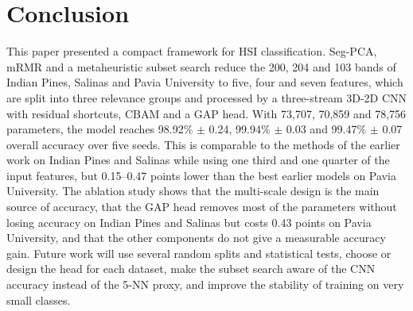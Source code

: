 \documentclass[conference]{IEEEtran}
\begin{document}
	\section{Conclusion} \label{conclusion}
	This paper presented a compact framework for HSI classification. Seg-PCA, mRMR and a metaheuristic subset search reduce the 200, 204 and 103 bands of Indian Pines, Salinas and Pavia University to five, four and seven features, which are split into three relevance groups and processed by a three-stream 3D-2D CNN with residual shortcuts, CBAM and a GAP head. With 73,707, 70,859 and 78,756 parameters, the model reaches 98.92\% $\pm$ 0.24, 99.94\% $\pm$ 0.03 and 99.47\% $\pm$ 0.07 overall accuracy over five seeds. This is comparable to the methods of the earlier work\cite{ahmed2024} on Indian Pines and Salinas while using one third and one quarter of the input features, but 0.15--0.47 points lower than the best earlier models on Pavia University. The ablation study shows that the multi-scale design is the main source of accuracy, that the GAP head removes most of the parameters without losing accuracy on Indian Pines and Salinas but costs 0.43 points on Pavia University, and that the other components do not give a measurable accuracy gain. Future work will use several random splits and statistical tests, choose or design the head for each dataset, make the subset search aware of the CNN accuracy instead of the 5-NN proxy, and improve the stability of training on very small classes.
	
	
	
	
\end{document}
